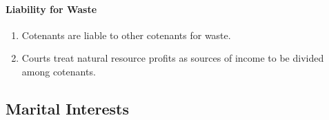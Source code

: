 \paragraph{Liability for Waste}

\begin{enumerate}
    \item Cotenants are liable to other cotenants for waste.
    \item Courts treat natural resource profits as sources of income to be 
    divided among cotenants.
\end{enumerate}

\subsection{Marital Interests}

